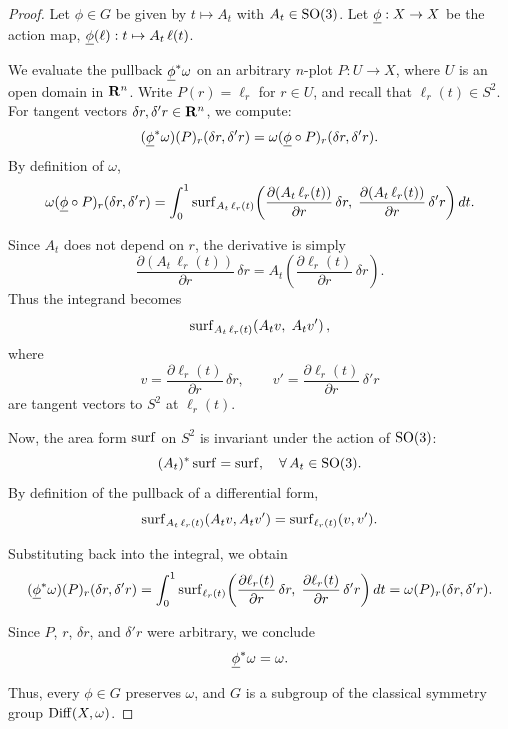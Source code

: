 \documentclass[11pt,reqno,letterpaper,twoside]{amsart}
\begin{document}
  \begin{proof}
    Let $\phi \in G$ be given by $t \mapsto A_{t}$ with $A_{t} \in \mathrm{SO}(3)$.
    Let $\uline{\phi} : X \to X$ be the action map, $\uline{\phi}(\ell) : t \mapsto A_{t}\,\ell(t)$.
    
    We evaluate the pullback $\uline{\phi}^{*}\omega$ on an arbitrary $n$-plot $P : U \to X$, where $U$ is an open domain in ${\mathbf{R}}^{n}$.
    Write $P(r) = \ell_{r}$ for $r \in U$, and recall that $\ell_{r}(t) \in S^{2}$.
    For tangent vectors $\delta r, \delta' r \in {\mathbf{R}}^{n}$, we compute:
    \[
      (\uline{\phi}^{*}\omega)(P)_{r}(\delta r, \delta' r)
      = \omega(\uline{\phi} \circ P)_{r}(\delta r, \delta' r).
      \]
    By definition of $\omega$,
    \[
      \omega(\uline{\phi} \circ P)_{r}(\delta r, \delta' r)
      = \int_{0}^{1} \Surf_{A_{t}\,\ell_{r}(t)}\!\left(
      \frac{\partial (A_{t}\,\ell_{r}(t))}{\partial r}\,\delta r,\;
      \frac{\partial (A_{t}\,\ell_{r}(t))}{\partial r}\,\delta' r
      \right) dt.
      \]
    
    Since $A_{t}$ does not depend on $r$, the derivative is simply
    \[
      \frac{\partial (A_{t}\,\ell_{r}(t))}{\partial r}\,\delta r
      = A_{t}\!\left( \frac{\partial \ell_{r}(t)}{\partial r}\,\delta r \right).
      \]
    Thus the integrand becomes
    \[
      \operatorname{surf}_{A_{t}\,\ell_{r}(t)}\!\left(
      A_{t} v,\; A_{t} v'
      \right),
      \]
    where
    \[
      v = \frac{\partial \ell_{r}(t)}{\partial r}\,\delta r,
      \qquad
      v' = \frac{\partial \ell_{r}(t)}{\partial r}\,\delta' r
      \]
    are tangent vectors to $S^{2}$ at $\ell_{r}(t)$.
    
    Now, the area form $\operatorname{surf}$ on $S^{2}$ is invariant under the action of $\mathrm{SO}(3)$:
    \[
      (A_{t})^{*}\operatorname{surf} = \operatorname{surf}, \quad \forall\, A_{t} \in \mathrm{SO}(3).
      \]
    By definition of the pullback of a differential form,
    \[
      \operatorname{surf}_{A_{t}\,\ell_{r}(t)}(A_{t} v, A_{t} v') = \operatorname{surf}_{\ell_{r}(t)}(v, v').
      \]
    
    Substituting back into the integral, we obtain
    \[
      (\uline{\phi}^{*}\omega)(P)_{r}(\delta r, \delta' r)
      = \int_{0}^{1} \Surf_{\ell_{r}(t)}\!\left(
      \frac{\partial \ell_{r}(t)}{\partial r}\,\delta r,\;
      \frac{\partial \ell_{r}(t)}{\partial r}\,\delta' r
      \right) dt
      = \omega(P)_{r}(\delta r, \delta' r).
      \]
    
    Since $P$, $r$, $\delta r$, and $\delta' r$ were arbitrary, we conclude
    \[
      \uline{\phi}^{*}\omega = \omega.
      \]
    
    Thus, every $\phi \in G$ preserves $\omega$, and $G$ is a subgroup of the classical symmetry group $\operatorname{Diff}(X,\omega)$.
  \end{proof}
  
\end{document}
